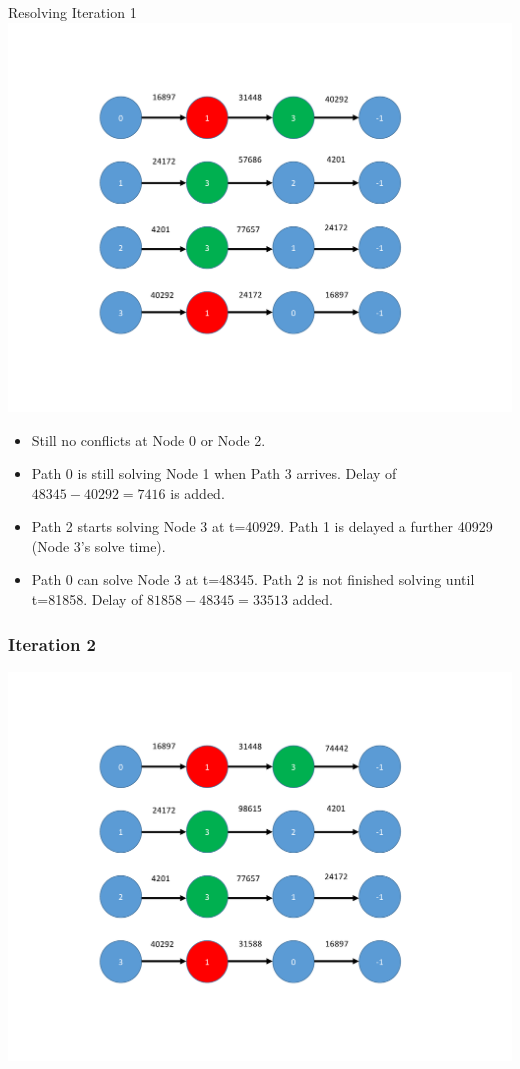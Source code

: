 \documentclass[xcolor={usenames,dvipsnames,svgnames,table}]{beamer}
\begin{document}
\begin{frame}[t]{Resolving Iteration 1}
\centering
\includegraphics[trim={2cm 2cm 4cm 2cm},clip,scale=0.2]{figures/iteration1_conflicts.pdf}
\begin{block}{}
\begin{itemize}
\item Still no conflicts at Node 0 or Node 2.
\item Path 0 is still solving Node 1 when Path 3 arrives. Delay of $48345-40292=7416$ is added.
\item Path 2 starts solving Node 3 at t=40929. Path 1 is delayed a further 40929 (Node 3's solve time). 
\item Path 0 can solve Node 3 at t=48345. Path 2 is not finished solving until t=81858. Delay of $81858-48345=33513$ added.
\end{itemize}
\end{block}
\end{frame}

\begin{frame}[t]\frametitle{Iteration 2}
\centering
\includegraphics[trim={2cm 2cm 4cm 2cm},clip,scale=0.45]{figures/iteration2.pdf}
\end{frame}
\end{document}
